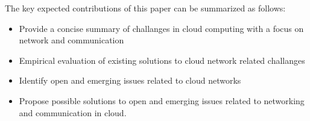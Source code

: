 



The key expected contributions of this paper can be summarized as follows:
\vspace{-2pt}
\begin{itemize}
 \denseitems
 \item 
 Provide a concise summary of challanges in cloud computing with a focus on network and communication
 \item 
 Empirical evaluation of existing solutions to cloud network related challanges
\item 
Identify open and emerging issues related to cloud networks
 \item 
 Propose possible solutions to open and emerging issues related to networking and communication in cloud.
 
\end{itemize}
